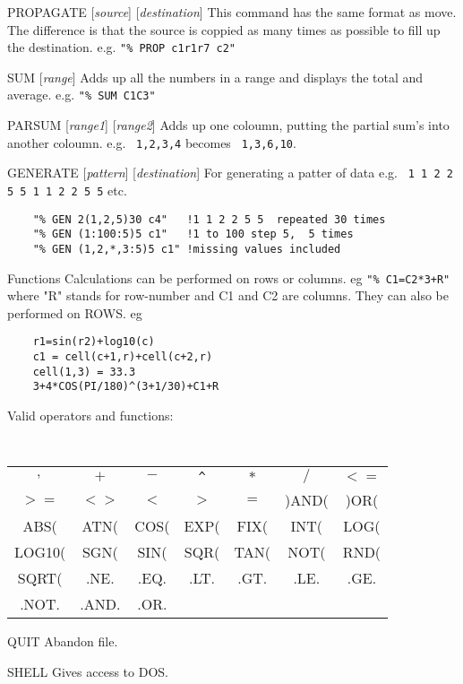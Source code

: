 \begin{commanddescription}
\item[{\sf PROPAGATE [{\it source}] [{\it destination}]}]
This command has the same format as move. 
The difference is that the source is coppied as many times as 
possible to fill up the destination. 
e.g. \verb#"% PROP c1r1r7 c2"#

\item[{\sf SUM [{\it range}]}]
Adds up all the numbers in a range and displays the total and average.
e.g. \verb#"% SUM C1C3"#

\item[{\sf PARSUM [{\it range1}] [{\it range2}]}]
Adds up one coloumn, putting the partial sum's into another coloumn. 
e.g. \verb# 1,2,3,4# becomes \verb# 1,3,6,10#.

\item[{\sf GENERATE [{\it pattern}] [{\it destination}]}]
For generating a patter of data e.g. \verb# 1 1 2 2 5 5 1 1 2 2 5 5# etc.
\begin{verbatim}
	"% GEN 2(1,2,5)30 c4"	!1 1 2 2 5 5  repeated 30 times
	"% GEN (1:100:5)5 c1"	!1 to 100 step 5,  5 times
	"% GEN (1,2,*,3:5)5 c1"	!missing values included
\end{verbatim}

\item[Functions]
Calculations can be performed on rows or columns. eg \verb#"% C1=C2*3+R"# 
where "R" stands for row-number and C1 and C2 are columns. 
They can also be performed on {\sf ROWS}. eg 
\begin{verbatim}
	r1=sin(r2)+log10(c)
	c1 = cell(c+1,r)+cell(c+2,r)
	cell(1,3) = 33.3
	3+4*COS(PI/180)^(3+1/30)+C1+R
\end{verbatim}
 Valid operators and functions:
{\tt
\begin{center}
\begin{tabular}{ccccccc}
 $,$   & $+$  & $-$  & \verb#^#  & $*$  & $/$  & $<=$  \\
 $>=$  & $<>$ & $<$  & $>$  & $=$  & )AND(& )OR(  \\
 ABS(  & ATN( & COS( & EXP( & FIX( & INT( & LOG(  \\
LOG10( & SGN( & SIN( & SQR( & TAN( & NOT( & RND(   \\
 SQRT( & .NE. & .EQ. & .LT. & .GT. & .LE. & .GE. \\
 .NOT. & .AND.& .OR. &      &      &      &       \\
\end{tabular}
\end{center}
}

\item[{\sf QUIT}]
Abandon file.


\item[{\sf SHELL}]
Gives access to DOS.
\end{commanddescription}

